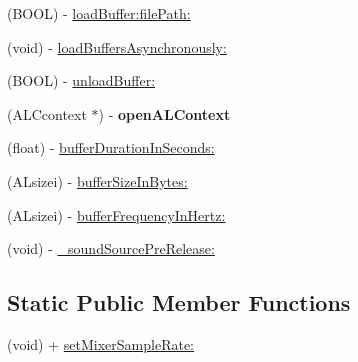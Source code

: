 \begin{DoxyCompactItemize}
\item 
(B\-O\-O\-L) -\/ \hyperlink{interface_c_d_sound_engine_ac3e13dbda55481b0b30e7ad8265867e4}{load\-Buffer\-:file\-Path\-:}
\item 
(void) -\/ \hyperlink{interface_c_d_sound_engine_a8ab83905d8865c75c8055871f5c84fdd}{load\-Buffers\-Asynchronously\-:}
\item 
(B\-O\-O\-L) -\/ \hyperlink{interface_c_d_sound_engine_a2a245d09bd9aa88de752c97dd889662e}{unload\-Buffer\-:}
\item 
\hypertarget{interface_c_d_sound_engine_a3207754d8ae7d5a63dc03fd43b698d12}{(A\-L\-Ccontext $\ast$) -\/ {\bfseries open\-A\-L\-Context}}\label{interface_c_d_sound_engine_a3207754d8ae7d5a63dc03fd43b698d12}

\item 
(float) -\/ \hyperlink{interface_c_d_sound_engine_a5731f4ec2052eb323ba1777f72c9da8c}{buffer\-Duration\-In\-Seconds\-:}
\item 
(A\-Lsizei) -\/ \hyperlink{interface_c_d_sound_engine_a91672bece24f10760d62cce27986573e}{buffer\-Size\-In\-Bytes\-:}
\item 
(A\-Lsizei) -\/ \hyperlink{interface_c_d_sound_engine_af8559b48f34ad22ba9a7cf27ffcb8648}{buffer\-Frequency\-In\-Hertz\-:}
\item 
(void) -\/ \hyperlink{interface_c_d_sound_engine_ad05b4a121e37fe36d3df453989be82af}{\-\_\-sound\-Source\-Pre\-Release\-:}
\end{DoxyCompactItemize}
\subsection*{Static Public Member Functions}
\begin{DoxyCompactItemize}
\item 
(void) + \hyperlink{interface_c_d_sound_engine_ab917455684b0ff4ea92e3d2a82d3530c}{set\-Mixer\-Sample\-Rate\-:}
\end{DoxyCompactItemize}
